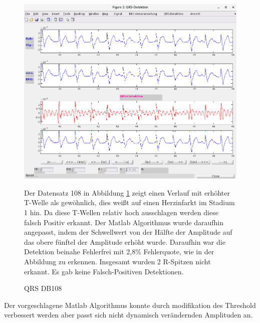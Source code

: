 \documentclass[a4paper,12pt,titlepage]{scrartcl}
\begin{document}
\begin{figure}[ht]
    \begin{minipage}[t]{0.5\linewidth}
        \centering
        \includegraphics[width=0.9\linewidth, valign=t]{Assets/LaborBMT-16-35-29.png}
        \caption{QRS DB108}
        \label{qrsdb108}
    \end{minipage}%
    \begin{minipage}[t]{0.5\linewidth}
        Der Datensatz 108 in Abbildung \ref{qrsdb108} zeigt einen Verlauf mit erhöhter T-Welle als gewöhnlich, dies weißt auf einen Herzinfarkt im Stadium 1 hin. Da diese T-Wellen relativ hoch ausschlagen werden diese falsch Positiv erkannt.
        Der Matlab Algorithmus wurde daraufhin angepasst, indem der Schwellwert von der Hälfte der Amplitude auf das obere fünftel der Amplitude erhöht wurde. Daraufhin war die Detektion beinahe Fehlerfrei mit 2,8\% Fehlerquote, wie in der Abbildung zu erkennen. Insgesamt wurden 2 R-Spitzen nicht erkannt. Es gab keine Falsch-Positiven Detektionen.
    \end{minipage}
\end{figure}

\cleardoublepage
Der vorgeschlagene Matlab Algorithmus konnte durch modifikation des Threshold verbessert werden aber passt sich nicht dynamisch verändernden Amplituden an.
\end{document}
